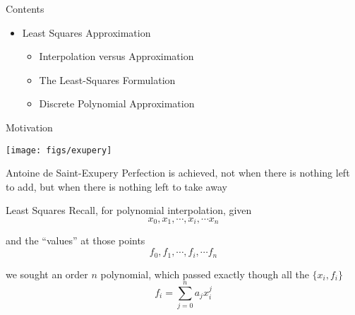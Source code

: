 \documentclass[xcolor=dvipsnames,11pt]{beamer}
\begin{document}
\begin{frame}{Contents}
\begin{itemize}
	
	\item Least Squares Approximation
	\begin{itemize}
		\item Interpolation versus Approximation
		\item The Least-Squares Formulation
		\item Discrete Polynomial Approximation
	\end{itemize}
\end{itemize}

\end{frame}


\begin{frame}{Motivation}

\begin{center}
\texttt{[image: figs/exupery]}
\end{center}

\begin{block}{Antoine de Saint-Exupery}
Perfection is achieved, not when there is nothing left to add, but when there is nothing left to take away
\end{block}

\end{frame}


\begin{frame}{Least Squares}
Recall, for polynomial interpolation, given
$$x_0, x_1, \cdots, x_i, \cdots x_n$$

and the ``values'' at those points
$$f_0, f_1, \cdots, f_i, \cdots f_n$$


we sought an order $n$ polynomial, which passed exactly though all the $\{x_i, f_i\}$
$$f_i = \sum\limits_{j=0}^{n} a_j x_i^j$$

\end{frame}
\end{document}

